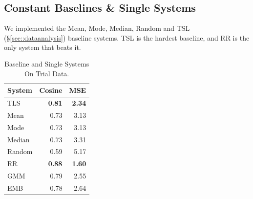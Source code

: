 \documentclass[11pt,letterpaper]{article}
\begin{document}
\subsection{Constant Baselines \& Single Systems}\label{sec:baselineResults}
We implemented the Mean, Mode, Median, Random and TSL (\S\ref{sec::dataanalysis}) baseline systems. TSL is the hardest baseline, and {\sc RR} is the only system that beats it.

\begin{table}[!ht]
\begin{center}
\begin{tabular}{|l|r|r|}
\hline
System & Cosine & MSE\\
\hline
TLS & {\bf 0.81} & {\bf 2.34}\\
Mean & 0.73 & 3.13\\
Mode & 0.73 & 3.13\\
Median & 0.73 & 3.31\\
Random & 0.59  & 5.17\\
\hline
{\sc RR} & {\bf 0.88} & {\bf 1.60}\\
GMM & 0.79  & 2.55\\
EMB & 0.78 & 2.64\\
\hline
\end{tabular}
\end{center}
\caption{Baseline and Single Systems On Trial Data.}
\label{tbl:baselines}
\end{table}





\end{document}
